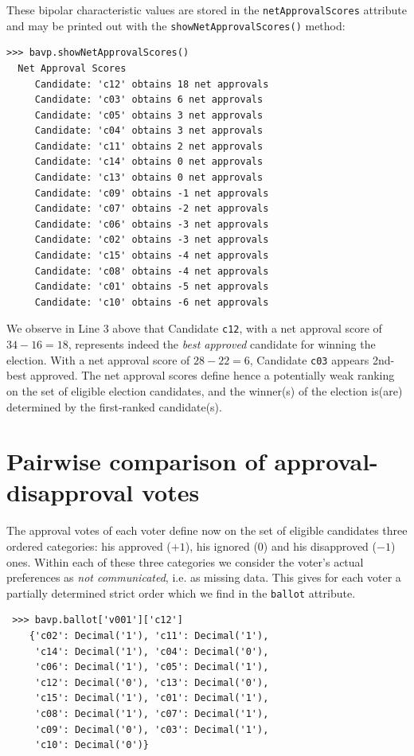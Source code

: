 These bipolar characteristic values are stored in the \texttt{netApprovalScores} attribute and may be printed out with the \texttt{showNetApprovalScores()} method:
\begin{lstlisting}
>>> bavp.showNetApprovalScores()
  Net Approval Scores
     Candidate: 'c12' obtains 18 net approvals
     Candidate: 'c03' obtains 6 net approvals
     Candidate: 'c05' obtains 3 net approvals
     Candidate: 'c04' obtains 3 net approvals
     Candidate: 'c11' obtains 2 net approvals
     Candidate: 'c14' obtains 0 net approvals
     Candidate: 'c13' obtains 0 net approvals
     Candidate: 'c09' obtains -1 net approvals
     Candidate: 'c07' obtains -2 net approvals
     Candidate: 'c06' obtains -3 net approvals
     Candidate: 'c02' obtains -3 net approvals
     Candidate: 'c15' obtains -4 net approvals
     Candidate: 'c08' obtains -4 net approvals
     Candidate: 'c01' obtains -5 net approvals
     Candidate: 'c10' obtains -6 net approvals
\end{lstlisting}

We observe in Line 3 above that Candidate \texttt{c12}, with a net approval score of $34 - 16 = 18$, represents indeed the \emph{best approved} candidate for winning the election. With a net approval score of $28-22 = 6$, Candidate \texttt{c03} appears 2nd-best approved. The net approval scores define hence a potentially weak ranking on the set of eligible election candidates, and the winner(s) of the election is(are) determined by the first-ranked candidate(s).

\section{Pairwise comparison of approval-disapproval votes}
\label{sec:20.3}

The approval votes of each voter define now on the set of eligible candidates three ordered categories: his approved ($+1$), his ignored ($0$) and his disapproved ($-1$) ones. Within each of these three categories we consider the voter's actual preferences as \emph{not communicated}, i.e. as missing data. This gives for each voter a partially determined strict order which we find in the \texttt{ballot} attribute.
\begin{lstlisting}
 >>> bavp.ballot['v001']['c12']
    {'c02': Decimal('1'), 'c11': Decimal('1'),
     'c14': Decimal('1'), 'c04': Decimal('0'),
     'c06': Decimal('1'), 'c05': Decimal('1'),
     'c12': Decimal('0'), 'c13': Decimal('0'),
     'c15': Decimal('1'), 'c01': Decimal('1'),
     'c08': Decimal('1'), 'c07': Decimal('1'),
     'c09': Decimal('0'), 'c03': Decimal('1'),
     'c10': Decimal('0')}
\end{lstlisting}

